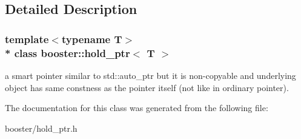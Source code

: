 \subsection{Detailed Description}
\subsubsection*{template$<$typename T$>$\\*
class booster\+::hold\+\_\+ptr$<$ T $>$}

a smart pointer similar to std\+::auto\+\_\+ptr but it is non-\/copyable and underlying object has same constness as the pointer itself (not like in ordinary pointer). 

The documentation for this class was generated from the following file\+:\begin{DoxyCompactItemize}
\item 
booster/hold\+\_\+ptr.\+h\end{DoxyCompactItemize}
